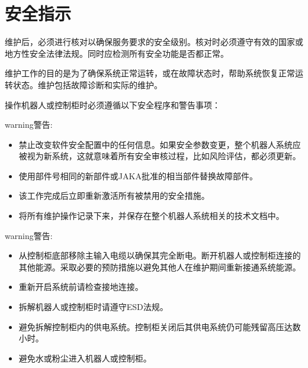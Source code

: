 \documentclass[a4paper,11pt,english,openany,oneside]{sphinxmanual}
\begin{document}
\section{安全指示}
\label{\detokenize{09 _u7ef4_u62a4:id2}}
\sphinxAtStartPar
维护后，必须进行核对以确保服务要求的安全级别。核对时必须遵守有效的国家或地方性安全法律法规。同时应检测所有安全功能是否都正常。

\sphinxAtStartPar
维护工作的目的是为了确保系统正常运转，或在故障状态时，帮助系统恢复正常运转状态。维护包括故障诊断和实际的维护。

\sphinxAtStartPar
操作机器人或控制柜时必须遵循以下安全程序和警告事项：

\begin{sphinxadmonition}{warning}{警告:}\begin{itemize}
\item {} 
\sphinxAtStartPar
禁止改变软件安全配置中的任何信息。如果安全参数变更，整个机器人系统应被视为新系统，这就意味着所有安全审核过程，比如风险评估，都必须更新。

\item {} 
\sphinxAtStartPar
使用部件号相同的新部件或JAKA批准的相当部件替换故障部件。

\item {} 
\sphinxAtStartPar
该工作完成后立即重新激活所有被禁用的安全措施。

\item {} 
\sphinxAtStartPar
将所有维护操作记录下来，并保存在整个机器人系统相关的技术文档中。

\end{itemize}
\end{sphinxadmonition}

\begin{sphinxadmonition}{warning}{警告:}\begin{itemize}
\item {} 
\sphinxAtStartPar
从控制柜底部移除主输入电缆以确保其完全断电。断开机器人或控制柜连接的其他能源。采取必要的预防措施以避免其他人在维护期间重新接通系统能源。

\item {} 
\sphinxAtStartPar
重新开启系统前请检查接地连接。

\item {} 
\sphinxAtStartPar
拆解机器人或控制柜时请遵守ESD法规。

\item {} 
\sphinxAtStartPar
避免拆解控制柜内的供电系统。控制柜关闭后其供电系统仍可能残留高压达数小时。

\item {} 
\sphinxAtStartPar
避免水或粉尘进入机器人或控制柜。

\end{itemize}
\end{sphinxadmonition}
\end{document}

